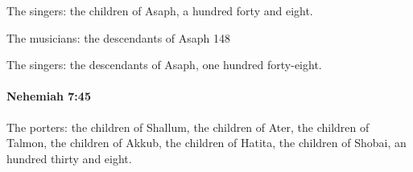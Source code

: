 			\begin{versebox}
					\item[BHS] 
					\item[LXX] 
					\item[ASV] The singers: the children of Asaph, a hundred forty and eight.
					\item[NIV] The musicians: the descendants of Asaph 148
					\item[NRSV] The singers: the descendants of Asaph, one hundred forty-eight.
			\end{versebox}

		\paragraph{Nehemiah 7:45} %
			\label{NEHEMIAH-7-45}

			The porters: the children of Shallum, the children of Ater, the children of Talmon, the children of Akkub, the children of Hatita, the children of Shobai, an hundred thirty and eight.

